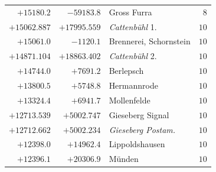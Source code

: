 \begin{center}
\begin{tabular}{r|r|p{170pt}|r}
\(+15180.2\)&\(-59183.8\)&Gross Furra&\(8\)\\
\(+15062.887\)&\(+17995.559\)&\textit{Cattenbühl} 1.&\(10\)\\
\(+15061.0\)&\(-1120.1\)&Brennerei, Schornstein&\(10\)\\
\(+14871.104\)&\(+18863.402\)&\textit{Cattenbühl} 2.&\(10\)\\
\(+14744.0\)&\(+7691.2\)&Berlepsch&\(10\)\\
\(+13800.5\)&\(+5748.8\)&Hermannrode&\(10\)\\
\(+13324.4\)&\(+6941.7\)&Mollenfelde&\(10\)\\
\(+12713.539\)&\(+5002.747\)&Gieseberg Signal&\(10\)\\
\(+12712.662\)&\(+5002.234\)&\textit{Gieseberg Postam.}&\(10\)\\
\(+12398.0\)&\(+14962.4\)&Lippoldshausen&\(10\)\\
\(+12396.1\)&\(+20306.9\)&Münden&\(10\)\\
\hline\end{tabular}\endgroup\end{center}
\clearpage
